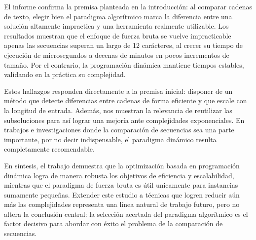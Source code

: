 El informe confirma la premisa planteada en la introducción: al comparar cadenas de texto, elegir bien el paradigma algorítmico marca la diferencia entre una solución altamente impractica y una herramienta realmente utilizable. Los resultados muestran que el enfoque de fuerza bruta se vuelve impracticable apenas las secuencias superan un largo de 12 carácteres, al crecer su
tiempo de ejecución de microsegundos a decenas de minutos en pocos
incrementos de tamaño. Por el contrario, la programación dinámica mantiene tiempos estables, validando en la práctica su complejidad.

\vspace{0.5 cm}

Estos hallazgos responden directamente a la premisa inicial: disponer de un método que detecte diferencias entre cadenas de forma eficiente y que escale con la longitud de entrada. Además, nos muestran la relevancia de reutilizar las subsoluciones para así lograr una mejoría ante complejidades exponenciales. En trabajos e investigaciones donde la comparación de secuencias sea una parte importante, por no decir indispensable, el paradigma
dinámico resulta completamente recomendable.

\vspace{0.5 cm}

En síntesis, el trabajo demuestra que la optimización basada en
programación dinámica logra de manera robusta los objetivos de eficiencia y escalabilidad, mientras que el paradigma de fuerza bruta es útil unicamente para instancias sumamente pequeñas. Extender este estudio a técnicas que logren reducir aún más las complejidades representa una línea natural de trabajo futuro, pero no altera la conclusión central: la selección acertada del paradigma algorítmico es el factor decisivo para abordar con éxito el problema de la comparación de secuencias.